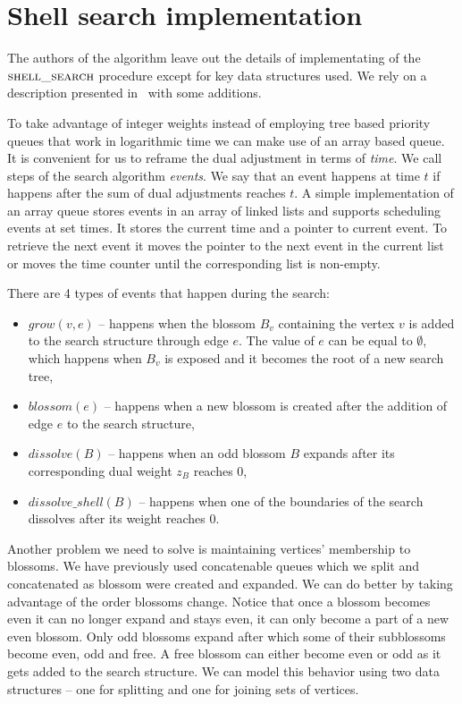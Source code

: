 \section{Shell search implementation}

The authors of the algorithm leave out the details of implementating of the $\textsc{shell\_search}$ procedure except for key data structures used. We rely on a description presented in~\cite{duan2018scaling} with some additions.

To take advantage of integer weights instead of employing tree based priority queues that work in logarithmic time we can make use of an array based queue. It is convenient for us to reframe the dual adjustment in terms of \textit{time}. We call steps of the search algorithm \textit{events}. We say that an event happens at time $t$ if happens after the sum of dual adjustments reaches $t$. A simple implementation of an array queue stores events in an array of linked lists and supports scheduling events at set times. It stores the current time and a pointer to current event. To retrieve the next event it moves the pointer to the next event in the current list or moves the time counter until the corresponding list is non-empty.

There are 4 types of events that happen during the search:

\begin{itemize}
    \item $grow(v, e)$ – happens when the blossom $B_v$ containing the vertex $v$ is added to the search structure through edge $e$. The value of $e$ can be equal to $\emptyset$, which happens when $B_v$ is exposed and it becomes the root of a new search tree,
    \item $blossom(e)$ – happens when a new blossom is created after the addition of edge $e$ to the search structure,
    \item $dissolve(B)$ – happens when an odd blossom $B$ expands after its corresponding dual weight $z_B$ reaches $0$,
    \item $dissolve\_shell(B)$ – happens when one of the boundaries of the search dissolves after its weight reaches $0$. 
\end{itemize}

Another problem we need to solve is maintaining vertices' membership to blossoms. We have previously used concatenable queues which we split and concatenated as blossom were created and expanded. We can do better by taking advantage of the order blossoms change. Notice that once a blossom becomes even it can no longer expand and stays even, it can only become a part of a new even blossom. Only odd blossoms expand after which some of their subblossoms become even, odd and free. A free blossom can either become even or odd as it gets added to the search structure. We can model this behavior using two data structures – one for splitting and one for joining sets of vertices.


